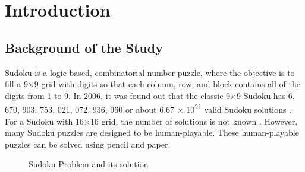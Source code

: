 \documentclass[a4paper,oneside,11pt]{report}
\begin{document}

\listoffigures

\newpage
{}
\listoftables

\tableofcontents


\newpage

\doublespacing

\chapter{Introduction}

\section{Background of the Study}
Sudoku is a logic-based, combinatorial number puzzle, where the objective is to fill a 9$\times$9 grid with digits so that each column, row, and block contains all of the digits from 1 to 9. In 2006, it was found out that the classic 9$\times$9 Sudoku has 6, 670, 903, 753, 021, 072, 936, 960 or about 6.67 $\times$ 10\textsuperscript{21} valid Sudoku solutions \cite{Felgenhauer}. For a Sudoku with 16$\times$16 grid, the number of solutions is not known \cite{Kapanowski}. However, many Sudoku puzzles are designed to be human-playable. These human-playable puzzles can be solved using pencil and paper.\\

\begin{figure}[h]
  \centering
  \hspace{3cm}
  \caption{Sudoku Problem and its solution}
\end{figure}
\end{document}
